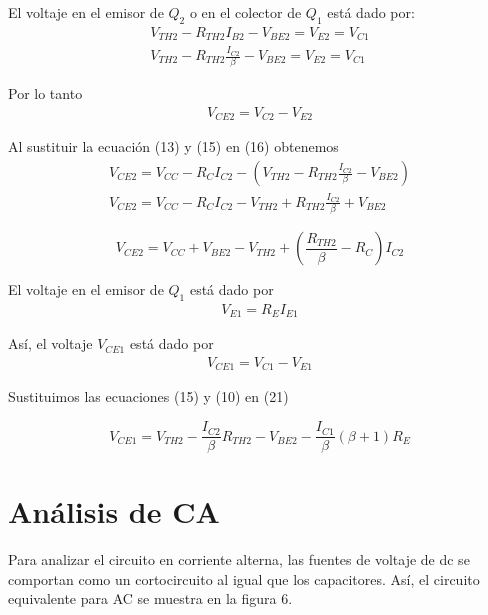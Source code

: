 \documentclass[12pt]{article}
\begin{document}
\noindent El voltaje en el emisor de $Q_2$ o en el colector de $Q_1$ está dado por:
\begin{align}
	V_{TH2} - R_{TH2}I_{B2} - V_{BE2} = V_{E2} = V_{C1}\\
	V_{TH2} - R_{TH2}\frac{I_{C2}}{\beta} - V_{BE2} = V_{E2} = V_{C1}
\end{align}

\noindent Por lo tanto
\begin{align}
	V_{CE2	} = V_{C2} - V_{E2}
\end{align}

Al sustituir la ecuación (13) y (15) en (16) obtenemos
\begin{align}
	V_{CE2} = V_{CC} - R_C I_{C2} - \left( V_{TH2} - R_{TH2}\frac{I_{C2}}{\beta} - V_{BE2} \right)\\
	V_{CE2} = V_{CC} - R_C I_{C2} - V_{TH2} + R_{TH2}\frac{I_{C2}}{\beta} + V_{BE2}
\end{align}

\begin{tcolorbox}[colback=red!5!white,colframe=red!75!black,arc=0mm,boxrule=0mm,width=(\linewidth+0.5cm)]
	\begin{equation}
		V_{CE2} = V_{CC} + V_{BE2} - V_{TH2} + \left( \frac{R_{TH2}}{\beta} - R_C \right)I_{C2}
	\end{equation}
\end{tcolorbox}

\noindent El voltaje en el emisor de $Q_1$ está dado por
\begin{align}
	V_{E1} = R_E I_{E1}
\end{align}

\noindent Así, el voltaje $V_{CE1}$ está dado por
\begin{align}
	V_{CE1} = V_{C1} - V_{E1}
\end{align}

\noindent Sustituimos las ecuaciones (15) y (10) en (21)
\begin{tcolorbox}[colback=red!5!white,colframe=red!75!black,arc=0mm,boxrule=0mm,width=(\linewidth+0.5cm)]
	\begin{equation}
		V_{CE1} = V_{TH2} - \frac{I_{C2}}{\beta}R_{TH2} - V_{BE2} - \frac{I_{C1}}{\beta}(\beta + 1)R_E
	\end{equation}
\end{tcolorbox}


\section*{Análisis de CA}
Para analizar el circuito en corriente alterna, las fuentes de voltaje de dc se comportan como un cortocircuito al igual que los capacitores. Así, el circuito equivalente para AC se muestra en la figura 6.
\end{document}
